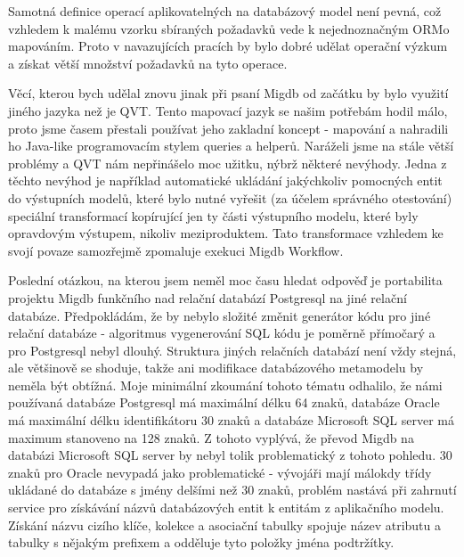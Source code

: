 \documentclass[11pt,twoside,a4paper]{book}
\begin{document}
Samotná definice operací aplikovatelných na databázový model není pevná, což
vzhledem k malému vzorku sbíraných požadavků vede k nejednoznačným ORMo
mapováním. Proto v navazujících pracích by bylo dobré udělat operační výzkum a
získat větší množství požadavků na tyto operace.

Věcí, kterou bych udělal znovu jinak při psaní Migdb od začátku by bylo využití
jiného jazyka než je QVT. Tento mapovací jazyk se našim potřebám hodil málo,
proto jsme časem přestali používat jeho zakladní koncept - mapování a nahradili
ho Java-like programovacím stylem queries a helperů. Naráželi jsme na stále
větší problémy a QVT nám nepřinášelo moc užitku, nýbrž některé nevýhody. Jedna z
těchto nevýhod je například automatické ukládání jakýchkoliv pomocných entit do
výstupních modelů, které bylo nutné vyřešit (za účelem správného
otestování) speciální transformací kopírující jen ty části výstupního modelu,
které byly opravdovým výstupem, nikoliv meziproduktem. Tato transformace
vzhledem ke svojí povaze samozřejmě zpomaluje exekuci Migdb Workflow.

Poslední otázkou, na kterou jsem neměl moc času hledat odpověď je portabilita
projektu Migdb funkčního nad relační databází Postgresql na jiné
relační databáze. Předpokládám, že by nebylo složité změnit generátor kódu
pro jiné relační databáze - algoritmus vygenerování SQL kódu je poměrně
přímočarý a pro Postgresql nebyl dlouhý. Struktura jiných relačních databází
není vždy stejná, ale většinově se shoduje, takže ani modifikace databázového
metamodelu by neměla být obtížná. Moje minimální zkoumání tohoto tématu
odhalilo, že námi používaná databáze Postgresql má maximální délku 64 znaků, 
databáze Oracle má maximální délku identifikátoru 30 znaků a databáze Microsoft 
SQL server má maximum stanoveno na 128 znaků. Z tohoto vyplývá, že převod Migdb 
na databázi Microsoft SQL server by nebyl tolik problematický z tohoto pohledu.
30 znaků pro Oracle nevypadá jako problematické - vývojáři mají málokdy třídy
ukládané do databáze s jmény delšími než 30 znaků, problém nastává při zahrnutí
service pro získávání názvů databázových entit k entitám z aplikačního modelu.
Získání názvu cizího klíče, kolekce a asociační tabulky spojuje název atributu a
tabulky s nějakým prefixem a odděluje tyto položky jména podtržítky. 
\end{document}
